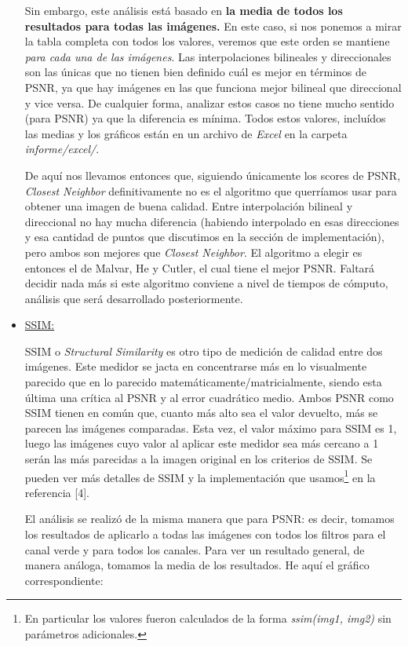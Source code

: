 \begin{itemize}
Sin embargo, este análisis está basado en \textbf{la media de todos los resultados para todas las imágenes.} En este caso, si nos ponemos a mirar la tabla completa con todos los valores, veremos que este orden se mantiene \textit{para cada una de las imágenes}. Las interpolaciones bilineales y direccionales son las únicas que no tienen bien definido cuál es mejor en términos de PSNR, ya que hay imágenes en las que funciona mejor bilineal que direccional y vice versa. De cualquier forma, analizar estos casos no tiene mucho sentido (para PSNR) ya que la diferencia es mínima. Todos estos valores, incluídos las medias y los gráficos están en un archivo de \textit{Excel} en la carpeta \textit{informe/excel/}.

\vspace{\baselineskip}

De aquí nos llevamos entonces que, siguiendo únicamente los scores de PSNR, \textit{Closest Neighbor} definitivamente no es el algoritmo que querríamos usar para obtener una imagen de buena calidad. Entre interpolación bilineal y direccional no hay mucha diferencia (habiendo interpolado en esas direcciones y esa cantidad de puntos que discutimos en la sección de implementación), pero ambos son mejores que \textit{Closest Neighbor}. El algoritmo a elegir es entonces el de Malvar, He y Cutler, el cual tiene el mejor PSNR. Faltará decidir nada más si este algoritmo conviene a nivel de tiempos de cómputo, análisis que será desarrollado posteriormente.

\item \underline{SSIM:}

SSIM o \textit{Structural Similarity} es otro tipo de medición de calidad entre dos imágenes. Este medidor se jacta en concentrarse más en lo visualmente parecido que en lo parecido matemáticamente/matricialmente, siendo esta última una crítica al PSNR y al error cuadrático medio. Ambos PSNR como SSIM tienen en común que, cuanto más alto sea el valor devuelto, más se parecen las imágenes comparadas. Esta vez, el valor máximo para SSIM es 1, luego las imágenes cuyo valor al aplicar este medidor sea más cercano a 1 serán las más parecidas a la imagen original en los criterios de SSIM. Se pueden ver más detalles de SSIM y la implementación que usamos\footnote{En particular los valores fueron calculados de la forma \textit{ssim(img1, img2)} sin parámetros adicionales.} en la referencia [4]. 

El análisis se realizó de la misma manera que para PSNR: es decir, tomamos los resultados de aplicarlo a todas las imágenes con todos los filtros para el canal verde y para todos los canales. Para ver un resultado general, de manera análoga, tomamos la media de los resultados. He aquí el gráfico correspondiente:


\end{itemize}
